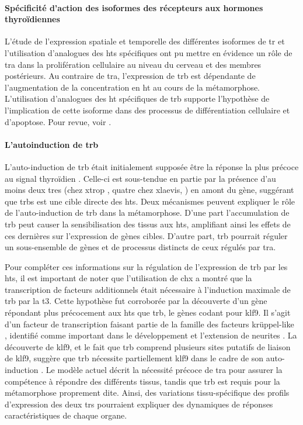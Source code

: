 \documentclass[../main.tex]{subfiles}
\begin{document}
\paragraph{Spécificité d'action des isoformes des récepteurs aux hormones thyroïdiennes}
L'étude de l'expression spatiale et temporelle des différentes isoformes de \gls{tr} et l'utilisation d'analogues des \glspl{ht} spécifiques ont pu mettre en évidence un rôle de \gls{tra} dans la prolifération cellulaire au niveau du cerveau et des membres postérieurs.
Au contraire de \gls{tra}, l'expression de \gls{trb} est dépendante de l'augmentation de la concentration en \gls{ht} au cours de la métamorphose.
L'utilisation d'analogues des \gls{ht} spécifiques de \gls{trb} supporte l'hypothèse de l'implication de cette isoforme dans des processus de différentiation cellulaire et d'apoptose.
Pour revue, voir \citep{Furlow2006,Denver2009a}.

\paragraph{L'autoinduction de \gls{trb}}
L'auto-induction de \gls{trb} était initialement supposée être la réponse la plus précoce au signal thyroïdien \citep{Yaoita1990}.
Celle-ci est sous-tendue en partie par la présence d'au moins deux \glspl{tre} (chez \gls{xtrop} \citealp{Bilesimo2011}, quatre chez \gls{xlaevis}, \citealp{Ranjan1994,Machuca1995,Urnov2001}) en amont du gène, suggérant que \glspl{trb} est une cible directe des \glspl{ht}.
Deux mécanismes peuvent expliquer le rôle de l'auto-induction de \gls{trb} dans la métamorphose.
D'une part l'accumulation de \gls{trb} peut causer la sensibilisation des tissus aux \glspl{ht}, amplifiant ainsi les effets de ces dernières sur l'expression de gènes cibles.
D'autre part, \gls{trb} pourrait réguler un sous-ensemble de gènes et de processus distincts de ceux régulés par \gls{tra}.
\par
Pour compléter ces informations sur la régulation de l'expression de \gls{trb} par les \glspl{ht}, il est important de noter que l'utilisation de \gls{chx} a montré que la transcription de facteurs additionnels était nécessaire à l'induction maximale de \gls{trb} par la \gls{t3}.
Cette hypothèse fut corroborée par la découverte d'un gène répondant plus précocement aux \glspl{ht} que \gls{trb}, le gènes codant pour \gls{klf9}.
Il s'agit d'un facteur de transcription faisant partie de la famille des facteurs krüppel-like \citep{Knoedler2014}, identifié comme important dans le développement et l'extension de neurites \citep{Scobie2009}.
La découverte de \gls{klf9}, et le fait que \gls{trb} comprend plusieurs sites putatifs de liaison de \gls{klf9}, suggère que \gls{trb} nécessite partiellement \gls{klf9} dans le cadre de son auto-induction \citep{Bagamasbad2008}.
Le modèle actuel décrit la nécessité précoce de \gls{tra} pour assurer la compétence à répondre des différents tissus, tandis que \gls{trb} est requis pour la métamorphose proprement dite.
Ainsi, des variations tissu-spécifique des profils d'expression des deux \glspl{tr} pourraient expliquer des dynamiques de réponses caractéristiques de chaque organe.
\end{document}
